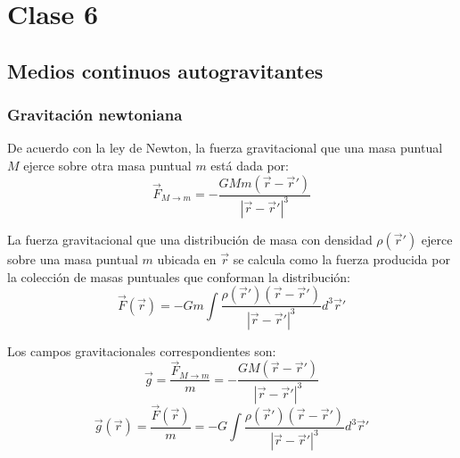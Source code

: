 \shorthandoff{<>}






\shorthandon{<>}

\chapter{Clase 6}

\section{Medios continuos autogravitantes}

\subsection{Gravitación newtoniana}

De acuerdo con la ley de Newton, la fuerza gravitacional que una masa puntual $M$ ejerce sobre otra masa puntual $m$ está dada por:
$$ \vec{F}_{M \to m} = - \frac{GMm(\vec{r} - \vec{r}')}{|\vec{r} - \vec{r}'|^3} $$

La fuerza gravitacional que una distribución de masa con densidad $\rho(\vec{r}')$ ejerce sobre una masa puntual $m$ ubicada en $\vec{r}$ se calcula como la fuerza producida por la colección de masas puntuales que conforman la distribución:
$$ \vec{F}(\vec{r}) = -Gm \int \frac{\rho(\vec{r}')(\vec{r} - \vec{r}')}{|\vec{r} - \vec{r}'|^3} d^3\vec{r}' $$

Los campos gravitacionales correspondientes son:
$$ \vec{g} = \frac{\vec{F}_{M \to m}}{m} = - \frac{GM(\vec{r} - \vec{r}')}{|\vec{r} - \vec{r}'|^3} $$
$$ \vec{g}(\vec{r}) = \frac{\vec{F}(\vec{r})}{m} = -G \int \frac{\rho(\vec{r}')(\vec{r} - \vec{r}')}{|\vec{r} - \vec{r}'|^3} d^3\vec{r}' $$

